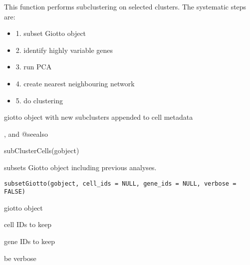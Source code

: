 \documentclass[a4paper]{book}
\begin{document}
%
\begin{Details}\relax
This function performs subclustering on selected clusters.
The systematic steps are:
\begin{itemize}

\item{} 1. subset Giotto object
\item{} 2. identify highly variable genes
\item{} 3. run PCA
\item{} 4. create nearest neighbouring network
\item{} 5. do clustering

\end{itemize}

\end{Details}
%
\begin{Value}
giotto object with new subclusters appended to cell metadata
\end{Value}
%
\begin{SeeAlso}\relax
{}, 
and  @seealso 
\end{SeeAlso}
%
\begin{Examples}
\begin{ExampleCode}
    subClusterCells(gobject)
\end{ExampleCode}
\end{Examples}
%
\begin{Description}\relax
subsets Giotto object including previous analyses.
\end{Description}
%
\begin{Usage}
\begin{verbatim}
subsetGiotto(gobject, cell_ids = NULL, gene_ids = NULL, verbose = FALSE)
\end{verbatim}
\end{Usage}
%
\begin{Arguments}
\begin{ldescription}
\item[\code{gobject}] giotto object

\item[\code{cell\_ids}] cell IDs to keep

\item[\code{gene\_ids}] gene IDs to keep

\item[\code{verbose}] be verbose
\end{ldescription}
\end{Arguments}
\end{document}
